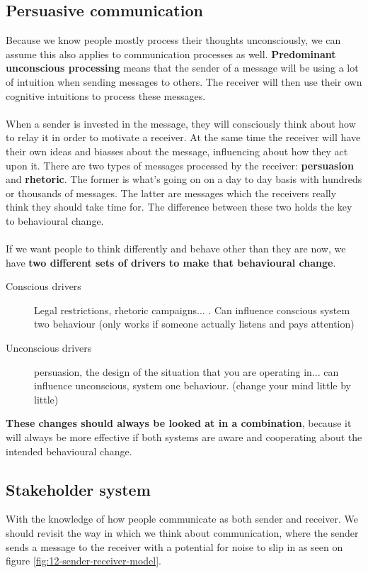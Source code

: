 \documentclass[../summary.tex]{subfiles}
\begin{document}
		\subsection{Persuasive communication}
			Because we know people mostly process their thoughts unconsciously, we can assume this also applies to communication processes as well. \textbf{Predominant unconscious processing} means that the sender of a message will be using a lot of intuition when sending messages to others. The receiver will then use their own cognitive intuitions to process these messages. \\
			\\
			When a sender is invested in the message, they will consciously think about how to relay it in order to motivate a receiver. At the same time the receiver will have their own ideas and biasses about the message, influencing about how they act upon it. There are two types of messages processed by the receiver: \textbf{persuasion} and \textbf{rhetoric}. The former is what's going on on a day to day basis with hundreds or thousands of messages. The latter are messages which the receivers really think they should take time for. The difference between these two holds the key to behavioural change.\\
			\\
			If we want people to think differently and behave other than they are now, we have \textbf{two different sets of drivers to make that behavioural change}.
			\begin{description}
				\item[Conscious drivers] Legal restrictions, rhetoric campaigns... . Can influence conscious system two behaviour (only works if someone actually listens and pays attention)
				\item[Unconscious drivers] persuasion, the design of the situation that you are operating in... can influence unconscious, system one behaviour.   (change your mind little by little)
			\end{description}
			\textbf{These changes should always be looked at in a combination}, because it will always be more effective if both systems are aware and cooperating about the intended behavioural change.
			
		\subsection{Stakeholder system}
			With the knowledge of how people communicate as both sender and receiver. We should revisit the way in which we think about communication, where the sender sends a message to the receiver with a potential for noise to slip in as seen on figure \ref{fig:12-sender-receiver-model}. \\
			
\end{document}
